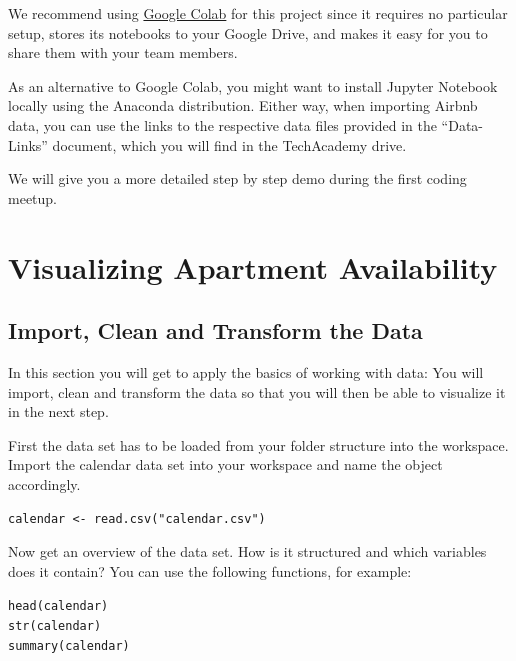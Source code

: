 \documentclass[
  11pt,
]{book}
\newenvironment{tips}[1]
  {
  \begin{itemize}
  \footnotesize
  \renewcommand{\labelitemi}{
    \raisebox{-.7\height}[0pt][0pt]{
      {\setkeys{Gin}{width=3em,keepaspectratio}
        \texttt{[image: images/\#1.png]}}
    }
  }
  \setlength{\fboxsep}{1em}
  \begin{rbox}
  \item
  }
  {
  \end{rbox}
  \end{itemize}
  }
\newenvironment{tipsp}[1]
  {
  \begin{itemize}
  \footnotesize
  \renewcommand{\labelitemi}{
    \raisebox{-.7\height}[0pt][0pt]{
      {\setkeys{Gin}{width=3em,keepaspectratio}
        \texttt{[image: images/\#1.png]}}
    }
  }
  \setlength{\fboxsep}{1em}
  \begin{pbox}
  \item
  }
  {
  \end{pbox}
  \end{itemize}
  }
\begin{document}
\begin{tipsp}p

We recommend using \href{https://colab.research.google.com}{Google Colab} for this project since it requires no particular setup, stores its notebooks to your Google Drive, and makes it easy for you to share them with your team members.

As an alternative to Google Colab, you might want to install Jupyter Notebook locally using the Anaconda distribution.
Either way, when importing Airbnb data, you can use the links to the respective data files provided in the ``Data-Links'' document, which you will find in the TechAcademy drive.

We will give you a more detailed step by step demo during the first coding meetup.

\end{tipsp}

\hypertarget{visualizing-apartment-availability}{%
\section{Visualizing Apartment Availability}\label{visualizing-apartment-availability}}

\hypertarget{import-clean-and-transform-the-data}{%
\subsection{Import, Clean and Transform the Data}\label{import-clean-and-transform-the-data}}

In this section you will get to apply the basics of working with data: You will import, clean and transform the data so that you will then be able to visualize it in the next step.

\begin{tips}r

First the data set has to be loaded from your folder structure into the workspace. Import the calendar data set into your workspace and name the object accordingly.

\texttt{calendar\ \textless{}-\ read.csv("calendar.csv")}

Now get an overview of the data set. How is it structured and which variables does it contain? You can use the following functions, for example:

\texttt{head(calendar)}~\\
\texttt{str(calendar)}~\\
\texttt{summary(calendar)}

\end{tips}
\end{document}
